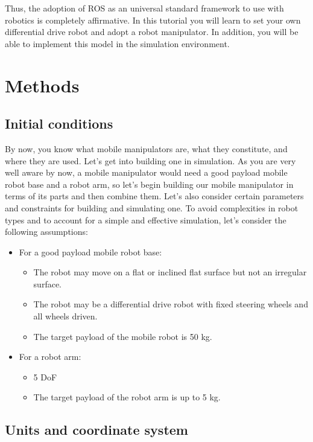 \documentclass[letterpaper,pdftex]{article}
\begin{document}
Thus, the adoption of ROS as an universal standard framework to use with robotics is completely affirmative. In this tutorial you will learn to set your own differential drive robot and adopt a robot manipulator. In addition, you will be able to implement this model in the simulation environment.

\section{Methods}

\subsection{Initial conditions}

By now, you know what mobile manipulators are, what they constitute, and where they are used. Let's get into building one in simulation. As you are very well aware by now, a mobile manipulator would need a good payload mobile robot base and a robot arm, so let's begin building our mobile manipulator in terms of its parts and then combine them. Let's also consider certain parameters and constraints for building and simulating one. To avoid complexities in robot types and to account for a simple and effective simulation, let's consider the following assumptions:
\begin{itemize}
\item For a good payload mobile robot base:
\begin{itemize}
\item The robot may move on a flat or inclined flat surface but not an irregular surface.
\item The robot may be a differential drive robot with fixed steering wheels and all wheels driven.
\item The target payload of the mobile robot is 50 kg.
\end{itemize}
\item For a robot arm:
\begin{itemize}
\item 5 DoF
\item The target payload of the robot arm is up to 5 kg.
\end{itemize}
\end{itemize}

\subsection{Units and coordinate system}
\end{document}
